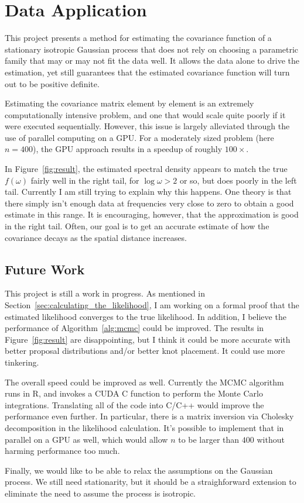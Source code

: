 \chapter{Data Application} \label{chapter4:Data-Application}

This project presents a method for estimating the covariance function of a stationary isotropic Gaussian process that does not rely on choosing a parametric family that may or may not fit the data well. It allows the data alone to drive the estimation, yet still guarantees that the estimated covariance function will turn out to be positive definite.

Estimating the covariance matrix element by element is an extremely computationally intensive problem, and one that would scale quite poorly if it were executed sequentially. However, this issue is largely alleviated through the use of parallel computing on a GPU. For a moderately sized problem (here $n = 400$), the GPU approach results in a speedup of roughly $100\times$.

In Figure~\ref{fig:result}, the estimated spectral density appears to match the true $f(\omega)$ fairly well in the right tail, for $\log \omega > 2$ or so, but does poorly in the left tail. Currently I am still trying to explain why this happens. One theory is that there simply isn't enough data at frequencies very close to zero to obtain a good estimate in this range. It is encouraging, however, that the approximation is good in the right tail. Often, our goal is to get an accurate estimate of how the covariance decays as the spatial distance increases.

\section{Future Work} %
\label{sec:future_work}

This project is still a work in progress. As mentioned in Section~\ref{sec:calculating_the_likelihood}, I am working on a formal proof that the estimated likelihood converges to the true likelihood. In addition, I believe the performance of Algorithm~\ref{alg:mcmc} could be improved. The results in Figure~\ref{fig:result} are disappointing, but I think it could be more accurate with better proposal distributions and/or better knot placement. It could use more tinkering.

The overall speed could be improved as well. Currently the MCMC algorithm runs in R, and invokes a CUDA C function to perform the Monte Carlo integrations. Translating all of the code into C/C++ would improve the performance even further. In particular, there is a matrix inversion via Cholesky decomposition in the likelihood calculation. It's possible to implement that in parallel on a GPU as well, which would allow $n$ to be larger than $400$ without harming performance too much.

Finally, we would like to be able to relax the assumptions on the Gaussian process. We still need stationarity, but it should be a straighforward extension to eliminate the need to assume the process is isotropic.

